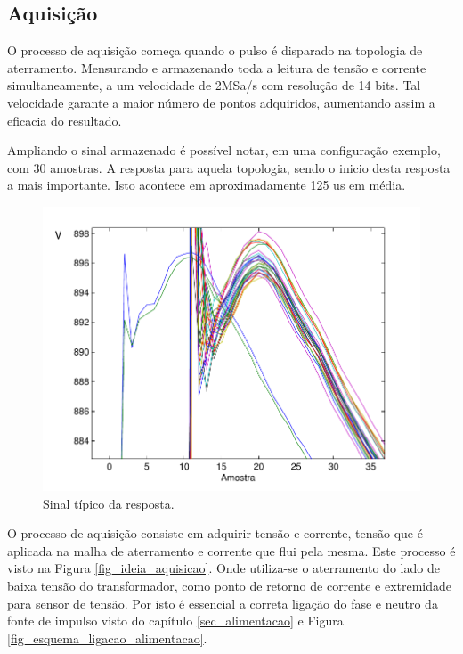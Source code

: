 \documentclass[a4paper, 10pt]{article}
\begin{document}
\subsection{Aquisição}

O processo de aquisição começa quando o pulso é disparado na topologia de aterramento.
Mensurando e armazenando toda a leitura de tensão e corrente simultaneamente, a um velocidade
de 2MSa/s com resolução de 14 bits. 
Tal velocidade garante a maior número de pontos adquiridos, 
aumentando assim a eficacia do resultado.

Ampliando o sinal armazenado é possível notar, em uma configuração exemplo, com 30
amostras. A resposta para aquela topologia, sendo o inicio desta resposta a mais 
importante. Isto acontece em aproximadamente 125 us em média.

\begin{figure}[!h]
    \caption{\label{fig_sinal} Sinal típico da resposta.}
	    \begin{center}
            \includegraphics[scale=0.5]{../fotos/sinal/sinal_detalhes-eps-converted-to.pdf}
	    \end{center}
\end{figure}

O processo de aquisição consiste em adquirir tensão e corrente, tensão 
que é aplicada na malha de aterramento e corrente que flui pela mesma. 
Este processo é visto na Figura \ref{fig_ideia_aquisicao}. Onde utiliza-se
o aterramento do lado de baixa tensão do transformador, como ponto de retorno
de corrente e extremidade para sensor de tensão. Por isto é essencial a 
correta ligação do fase e neutro da fonte de impulso visto do capítulo \ref{sec_alimentacao}
e Figura \ref{fig_esquema_ligacao_alimentacao}.
\end{document}
